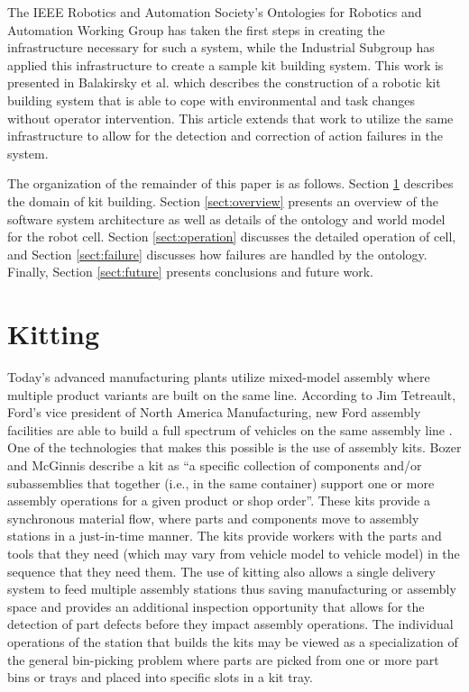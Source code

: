 The IEEE Robotics and Automation Society's Ontologies for Robotics and Automation Working Group has taken the first steps in creating the 
infrastructure necessary for such a system, while the Industrial Subgroup has applied this infrastructure to create a sample kit building
system.  This work is presented in Balakirsky et al. \cite{balakirsky2013} which describes the construction of a robotic kit building
system that is able to cope with environmental and task changes without operator intervention. This article extends that work to utilize
the same infrastructure to allow for the detection and correction of action failures in the system.

The organization of the remainder of this paper is as follows. Section \ref{sect:kitting} describes the domain of kit building. Section \ref{sect:overview} presents
an overview of the software system architecture as well as details of the ontology and world model for the robot cell. Section \ref{sect:operation} discusses the detailed operation of cell, and Section \ref{sect:failure} discusses how failures are handled by the ontology. Finally, Section \ref{sect:future} presents
conclusions and future work.
%
%
\section{Kitting}
\label{sect:kitting}
Today's advanced manufacturing plants utilize mixed-model assembly where multiple product variants are built on the same line.  
According to Jim Tetreault, Ford’s vice president of North America Manufacturing, 
new Ford assembly facilities are able to build a full spectrum of vehicles on the same assembly line \cite{James2011}. One of the technologies that makes this possible
is the use of assembly kits.  Bozer and McGinnis \cite{Bozer1992} describe a kit as ``a specific
collection of components and/or subassemblies that together (i.e., in the same container) support one or more assembly
operations for a given product or shop order''. These  kits provide a synchronous material flow, where parts and components move to 
assembly stations in a just-in-time manner. The kits provide workers with the parts and tools that they need (which may vary from 
vehicle model to vehicle model) in the sequence that they need them. The use of kitting also allows a single delivery system to feed
multiple assembly stations thus saving manufacturing or assembly space \cite{Medbo2003} and provides an additional inspection opportunity 
that allows for the detection of part defects before they impact assembly operations. The individual operations of the station 
that builds the kits may be viewed as a specialization of the general
bin-picking problem \cite{Schyja2012} where parts are picked from one or more part bins or trays and placed into specific slots in a kit tray.

